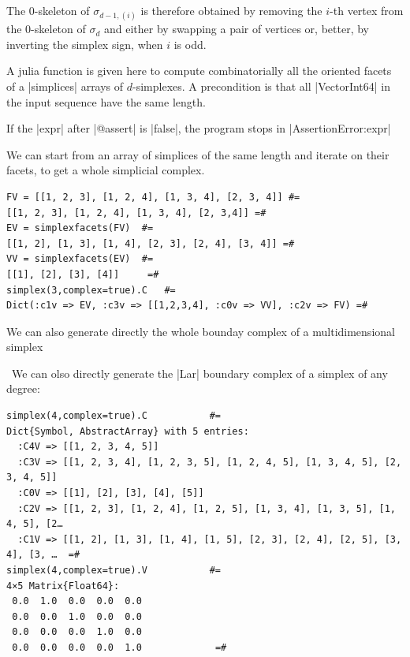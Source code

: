 The $0$-skeleton of $\sigma_{d-1,(i)}$ is therefore obtained by removing the 
$i$-th vertex from the $0$-skeleton of $\sigma_{d}$ and either by swapping 
a pair of vertices or, better, by inverting the simplex sign, when $i$ 
is odd.  


\begin{coding} A julia function is given here to compute combinatorially all the oriented facets of a |simplices| arrays of $d$-simplexes. A precondition is that all |Vector{Int64}| in the input sequence have the same length.

If the |expr| after |@assert| is |false|, the program stops in |AssertionError:expr| 
\end{coding}

\begin{coding} We can start from an array of simplices of the same length and iterate on their facets, to get a whole simplicial complex.
\begin{lstlisting}[language=JuliaLocal, style=julia, mathescape = true]
FV = [[1, 2, 3], [1, 2, 4], [1, 3, 4], [2, 3, 4]] #=
[[1, 2, 3], [1, 2, 4], [1, 3, 4], [2, 3,4]] =#
EV = simplexfacets(FV)  #=
[[1, 2], [1, 3], [1, 4], [2, 3], [2, 4], [3, 4]] =#
VV = simplexfacets(EV)  #=
[[1], [2], [3], [4]]     =#
simplex(3,complex=true).C   #=
Dict(:c1v => EV, :c3v => [[1,2,3,4], :c0v => VV], :c2v => FV) =#
\end{lstlisting}
\end{coding}
We can also generate directly the whole bounday complex of a multidimensional simplex

\begin{coding}\ 
We can olso directly generate the |Lar| boundary complex of a simplex of any degree:
\begin{lstlisting}[language=JuliaLocal, style=julia, mathescape = true]
simplex(4,complex=true).C			#=
Dict{Symbol, AbstractArray} with 5 entries:
  :C4V => [[1, 2, 3, 4, 5]]
  :C3V => [[1, 2, 3, 4], [1, 2, 3, 5], [1, 2, 4, 5], [1, 3, 4, 5], [2, 3, 4, 5]]
  :C0V => [[1], [2], [3], [4], [5]]
  :C2V => [[1, 2, 3], [1, 2, 4], [1, 2, 5], [1, 3, 4], [1, 3, 5], [1, 4, 5], [2…
  :C1V => [[1, 2], [1, 3], [1, 4], [1, 5], [2, 3], [2, 4], [2, 5], [3, 4], [3, …  =#
simplex(4,complex=true).V			#=
4×5 Matrix{Float64}:
 0.0  1.0  0.0  0.0  0.0
 0.0  0.0  1.0  0.0  0.0
 0.0  0.0  0.0  1.0  0.0
 0.0  0.0  0.0  0.0  1.0			 =#
\end{lstlisting}
\end{coding}


